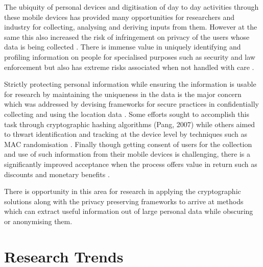 The ubiquity of personal devices and digitisation of day to day activities through these mobile devices \citep{mcmeel2018dark} has provided many opportunities for researchers and industry for collecting, analysing and deriving inputs from them.
However at the same this also increased the risk of infringement on privacy of the users whose data is being collected \cite{saponas2007, krumm2009}.
There is immense value in uniquely identifying and profiling information on people for specialised purposes such as security \citep{cutter2006} and law enforcement \citep{dobson2003} but also has extreme risks associated when not handled with care \citep{vanwey2005}.

Strictly protecting personal information while ensuring the information is usable for research by maintaining the uniqueness in the data is the major concern which was addressed by devising frameworks for secure practices in confidentially collecting and using the location data \citep{duckham2006, tang2006, lane2014}.
Some efforts sought to accomplish this task through cryptographic hashing algorithms (Pang, 2007) while others aimed to thwart identification and tracking at the device level by techniques such as MAC randomisation \citep{gruteser2005, green2008}.
Finally though getting consent of users for the collection and use of such information from their mobile devices is challenging, there is a significantly improved acceptance when the process offers value in return such as discounts and monetary benefits \citep{kobsa2014user}.

There is opportunity in this area for research in applying the cryptographic solutions along with the privacy preserving frameworks to arrive at methods which can extract useful information out of large personal data while obscuring or anonymising them.

\section{Research Trends}

